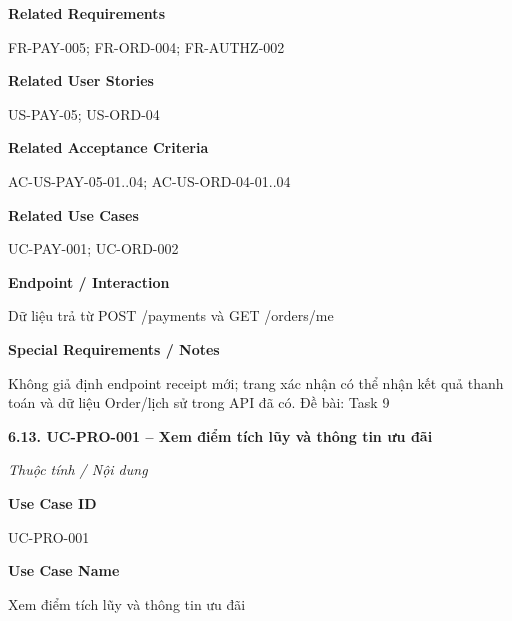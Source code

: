 \documentclass[11pt,a4paper,oneside]{report}
\begin{document}
\par\smallskip\noindent\textcolor{sgublue}{\textbf{Related Requirements}}\par\nobreak
FR-PAY-005; FR-ORD-004; FR-AUTHZ-002
\par

\par\smallskip\noindent\textcolor{sgublue}{\textbf{Related User Stories}}\par\nobreak
US-PAY-05; US-ORD-04
\par

\par\smallskip\noindent\textcolor{sgublue}{\textbf{Related Acceptance Criteria}}\par\nobreak
AC-US-PAY-05-01..04; AC-US-ORD-04-01..04
\par

\par\smallskip\noindent\textcolor{sgublue}{\textbf{Related Use Cases}}\par\nobreak
UC-PAY-001; UC-ORD-002
\par

\par\smallskip\noindent\textcolor{sgublue}{\textbf{Endpoint / Interaction}}\par\nobreak
Dữ liệu trả từ POST /payments và GET /orders/me
\par

\par\smallskip\noindent\textcolor{sgublue}{\textbf{Special Requirements / Notes}}\par\nobreak
Không giả định endpoint receipt mới; trang xác nhận có thể nhận kết quả thanh toán và dữ liệu Order/lịch sử trong API đã có. \textbar{} Đề bài: Task 9
\par



\textbf{6.13. UC-PRO-001 -- Xem điểm tích lũy và thông tin ưu đãi}



\par\noindent\textit{Thuộc tính / Nội dung}\par

\par\smallskip\noindent\textcolor{sgublue}{\textbf{Use Case ID}}\par\nobreak
UC-PRO-001
\par

\par\smallskip\noindent\textcolor{sgublue}{\textbf{Use Case Name}}\par\nobreak
Xem điểm tích lũy và thông tin ưu đãi
\par
\end{document}
